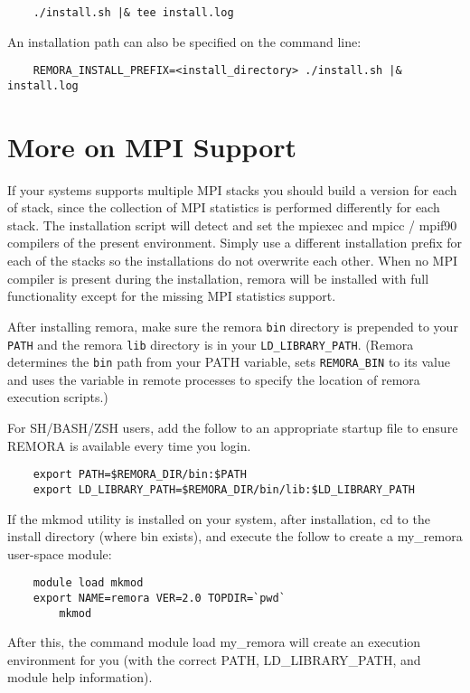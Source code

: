 \documentclass[10pt,a4paper]{report}
\begin{document}
\begin{verbatim}
    ./install.sh |& tee install.log
\end{verbatim}

An installation path can also be specified on the command line:
\begin{verbatim}
    REMORA_INSTALL_PREFIX=<install_directory> ./install.sh |& install.log
\end{verbatim}

\section{More on MPI Support}
If your systems supports multiple MPI stacks you should build a version 
for each of stack, since the collection of MPI statistics is performed differently for each stack.
The installation script will detect and set the mpiexec and 
mpicc / mpif90 compilers of the present environment.
Simply use a different installation prefix for each of the 
stacks so the installations do not overwrite each other. 
When no MPI compiler is present during the installation, remora will be installed with 
full functionality except for the missing MPI statistics support.

After installing remora, make sure the remora \verb+bin+ directory is prepended to your \verb+PATH+ 
and the remora \verb+lib+ directory is in your \verb|LD_LIBRARY_PATH|. 
(Remora determines the \verb+bin+ path from your PATH variable, sets \verb|REMORA_BIN| to its 
value and uses the variable in remote processes to specify the location of remora execution scripts.) 

For SH/BASH/ZSH users, add the follow to an appropriate startup file to ensure REMORA 
is available every time you login. 
\begin{verbatim}
	export PATH=$REMORA_DIR/bin:$PATH
	export LD_LIBRARY_PATH=$REMORA_DIR/bin/lib:$LD_LIBRARY_PATH
\end{verbatim}

If the mkmod utility is installed on your system, after installation, cd to the install
directory (where bin exists), and execute the follow to create a my\_remora user-space module:
\begin{verbatim}
	module load mkmod 
	export NAME=remora VER=2.0 TOPDIR=`pwd` 
        mkmod
\end{verbatim}
After this, the command module load my\_remora will create an execution environment for you
(with the correct PATH, LD\_LIBRARY\_PATH, and module help information).
\end{document}
